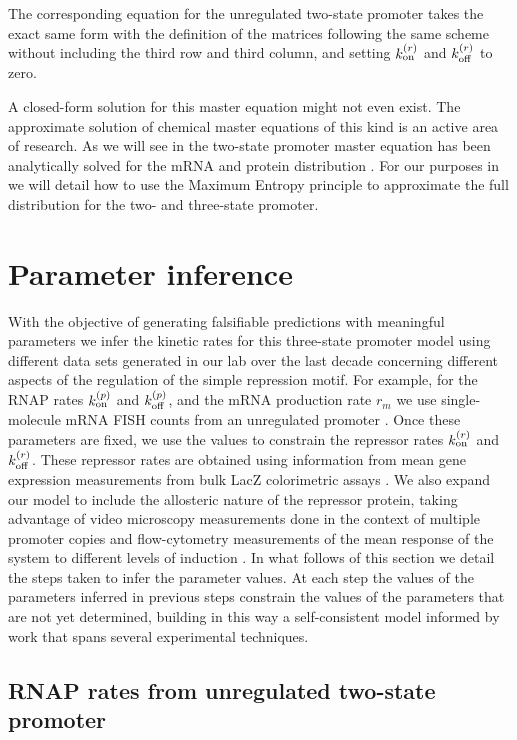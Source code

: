 The corresponding equation for the unregulated two-state promoter takes the
exact same form with the definition of the matrices following the same scheme
without including the third row and third column, and setting $k^{(r)}_{\text{on}}$ and
$k^{(r)}_{\text{off}}$ to zero.

A closed-form solution for this master equation might not even exist. The
approximate solution of chemical master equations of this kind is an active area
of research. As we will see in  the two-state
promoter master equation has been analytically solved for the mRNA
\cite{Peccoud1995} and protein distribution \cite{Shahrezaei2008}. For our
purposes in  we will detail how to use the Maximum Entropy
principle to approximate the full distribution for the two- and three-state
promoter.

\section{Parameter inference}\label{supp_param_inference}

With the objective of generating falsifiable predictions with meaningful
parameters we infer the kinetic rates for this three-state promoter model using
different data sets generated in our lab over the last decade concerning
different aspects of the regulation of the simple repression motif. For example,
for the RNAP rates $k^{(p)}_{\text{on}}$ and $k^{(p)}_{\text{off}}$, and the mRNA production rate $r_m$ we
use single-molecule mRNA FISH counts from an unregulated promoter
\cite{Jones2014a}. Once these parameters are fixed, we use the values to
constrain the repressor rates $k^{(r)}_{\text{on}}$ and $k^{(r)}_{\text{off}}$. These repressor rates are
obtained using information from mean gene expression measurements from bulk LacZ
colorimetric assays \cite{Garcia2011c}. We also expand our model to include the
allosteric nature of the repressor protein, taking advantage of video microscopy
measurements done in the context of multiple promoter copies \cite{Brewster2014}
and flow-cytometry measurements of the mean response of the system to different
levels of induction \cite{Razo-Mejia2018}. In what follows of this section we
detail the steps taken to infer the parameter values. At each step the values of
the parameters inferred in previous steps constrain the values of the
parameters that are not yet determined, building in this way a self-consistent
model informed by work that spans several experimental techniques.

\subsection{RNAP rates from unregulated two-state promoter}


